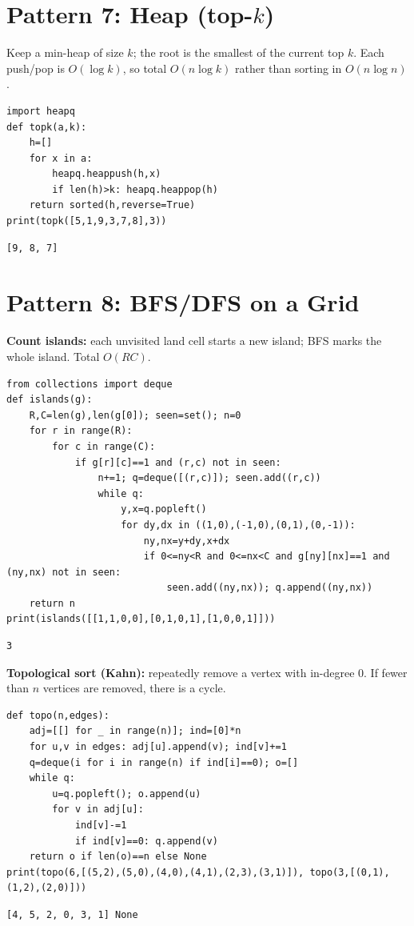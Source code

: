 \documentclass[11pt,a4paper]{article}
\begin{document}
\section{Pattern 7: Heap (top-$k$)}
Keep a min-heap of size $k$; the root is the smallest of the current top $k$. Each push/pop is $O(\log k)$, so total $O(n\log k)$ rather than sorting in $O(n\log n)$.
\begin{lstlisting}
import heapq
def topk(a,k):
    h=[]
    for x in a:
        heapq.heappush(h,x)
        if len(h)>k: heapq.heappop(h)
    return sorted(h,reverse=True)
print(topk([5,1,9,3,7,8],3))
\end{lstlisting}
\begin{lstlisting}[style=out]
[9, 8, 7]
\end{lstlisting}

\section{Pattern 8: BFS/DFS on a Grid}
\textbf{Count islands:} each unvisited land cell starts a new island; BFS marks the whole island. Total $O(RC)$.
\begin{lstlisting}
from collections import deque
def islands(g):
    R,C=len(g),len(g[0]); seen=set(); n=0
    for r in range(R):
        for c in range(C):
            if g[r][c]==1 and (r,c) not in seen:
                n+=1; q=deque([(r,c)]); seen.add((r,c))
                while q:
                    y,x=q.popleft()
                    for dy,dx in ((1,0),(-1,0),(0,1),(0,-1)):
                        ny,nx=y+dy,x+dx
                        if 0<=ny<R and 0<=nx<C and g[ny][nx]==1 and (ny,nx) not in seen:
                            seen.add((ny,nx)); q.append((ny,nx))
    return n
print(islands([[1,1,0,0],[0,1,0,1],[1,0,0,1]]))
\end{lstlisting}
\begin{lstlisting}[style=out]
3
\end{lstlisting}
\textbf{Topological sort (Kahn):} repeatedly remove a vertex with in-degree 0. If fewer than $n$ vertices are removed, there is a cycle.
\begin{lstlisting}
def topo(n,edges):
    adj=[[] for _ in range(n)]; ind=[0]*n
    for u,v in edges: adj[u].append(v); ind[v]+=1
    q=deque(i for i in range(n) if ind[i]==0); o=[]
    while q:
        u=q.popleft(); o.append(u)
        for v in adj[u]:
            ind[v]-=1
            if ind[v]==0: q.append(v)
    return o if len(o)==n else None
print(topo(6,[(5,2),(5,0),(4,0),(4,1),(2,3),(3,1)]), topo(3,[(0,1),(1,2),(2,0)]))
\end{lstlisting}
\begin{lstlisting}[style=out]
[4, 5, 2, 0, 3, 1] None
\end{lstlisting}
\end{document}
